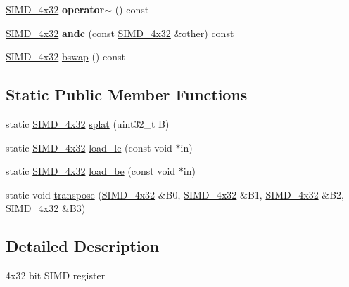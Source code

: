 \begin{DoxyCompactItemize}
\item 
\mbox{\label{class_botan_1_1_s_i_m_d__4x32_ae5ee176082beafcd0ea6ebcd67ccd27e}} 
\mbox{\hyperlink{class_botan_1_1_s_i_m_d__4x32}{S\+I\+M\+D\+\_\+4x32}} {\bfseries operator$\sim$} () const
\item 
\mbox{\label{class_botan_1_1_s_i_m_d__4x32_a7779c5d1a2bd94f92a65f2dfcb63bfe4}} 
\mbox{\hyperlink{class_botan_1_1_s_i_m_d__4x32}{S\+I\+M\+D\+\_\+4x32}} {\bfseries andc} (const \mbox{\hyperlink{class_botan_1_1_s_i_m_d__4x32}{S\+I\+M\+D\+\_\+4x32}} \&other) const
\item 
\mbox{\hyperlink{class_botan_1_1_s_i_m_d__4x32}{S\+I\+M\+D\+\_\+4x32}} \mbox{\hyperlink{class_botan_1_1_s_i_m_d__4x32_a7efd5ff4f90609b6c7c5ad88d6814f77}{bswap}} () const
\end{DoxyCompactItemize}
\subsection*{Static Public Member Functions}
\begin{DoxyCompactItemize}
\item 
static \mbox{\hyperlink{class_botan_1_1_s_i_m_d__4x32}{S\+I\+M\+D\+\_\+4x32}} \mbox{\hyperlink{class_botan_1_1_s_i_m_d__4x32_a2d92ac1bb185cb89e5e4d413f5ef6d34}{splat}} (uint32\+\_\+t B)
\item 
static \mbox{\hyperlink{class_botan_1_1_s_i_m_d__4x32}{S\+I\+M\+D\+\_\+4x32}} \mbox{\hyperlink{class_botan_1_1_s_i_m_d__4x32_af66d289408de2822e808bc06f06db35f}{load\+\_\+le}} (const void $\ast$in)
\item 
static \mbox{\hyperlink{class_botan_1_1_s_i_m_d__4x32}{S\+I\+M\+D\+\_\+4x32}} \mbox{\hyperlink{class_botan_1_1_s_i_m_d__4x32_a9d47a7d56f29498c1cf8d2b7ff2ad28a}{load\+\_\+be}} (const void $\ast$in)
\item 
static void \mbox{\hyperlink{class_botan_1_1_s_i_m_d__4x32_a900ee1610d3e60c3bc35c02bbc96b1e5}{transpose}} (\mbox{\hyperlink{class_botan_1_1_s_i_m_d__4x32}{S\+I\+M\+D\+\_\+4x32}} \&B0, \mbox{\hyperlink{class_botan_1_1_s_i_m_d__4x32}{S\+I\+M\+D\+\_\+4x32}} \&B1, \mbox{\hyperlink{class_botan_1_1_s_i_m_d__4x32}{S\+I\+M\+D\+\_\+4x32}} \&B2, \mbox{\hyperlink{class_botan_1_1_s_i_m_d__4x32}{S\+I\+M\+D\+\_\+4x32}} \&B3)
\end{DoxyCompactItemize}


\subsection{Detailed Description}
4x32 bit S\+I\+MD register

